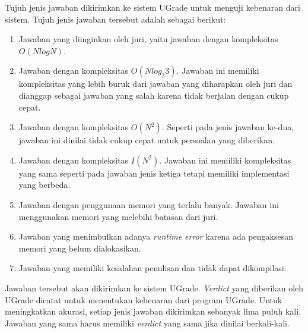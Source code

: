 \par Tujuh jenis jawaban dikirimkan ke sistem UGrade untuk menguji kebenaran dari sistem. Tujuh jenis jawaban tersebut adalah sebagai berikut:
\begin{enumerate}
	\item Jawaban yang diinginkan oleh juri, yaitu jawaban dengan kompleksitas $O(N log N)$.
	\item Jawaban dengan kompleksitas $O(N log_2{3})$. Jawaban ini memiliki kompleksitas yang lebih buruk dari jawaban yang diharapkan oleh juri dan dianggap sebagai jawaban yang salah karena tidak berjalan dengan cukup cepat.
	\item Jawaban dengan kompleksitas $O(N^2)$. Seperti pada jenis jawaban ke-dua, jawaban ini dinilai tidak cukup cepat untuk persoalan yang diberikan.
	\item Jawaban dengan kompleksitas $I(N^2)$. Jawaban ini memiliki kompleksitas yang sama seperti pada jawaban jenis ketiga tetapi memiliki implementasi yang berbeda.
	\item Jawaban dengan penggunaan memori yang terlalu banyak. Jawaban ini menggunakan memori yang melebihi batasan dari juri.
	\item Jawaban yang menimbulkan adanya \textit{runtime error} karena ada pengaksesan memori yang belum dialokasikan.
	\item Jawaban yang memiliki kesalahan penulisan dan tidak dapat dikompilasi.
\end{enumerate}
Jawaban tersebut akan dikirimkan ke sistem UGrade. \textit{Verdict} yang diberikan oleh UGrade dicatat untuk menentukan kebenaran dari program UGrade. Untuk meningkatkan akurasi, setiap jenis jawaban dikirimkan sebanyak lima puluh kali. Jawaban yang sama harus memiliki \textit{verdict} yang sama jika dinilai berkali-kali.

